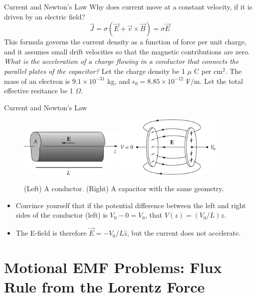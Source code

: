 \documentclass{beamer}
\begin{document}
\begin{frame}{Current and Newton's Law}
Why does current move at a constant velocity, if it is driven by an electric field?
\begin{equation}
\vec{J} = \sigma (\vec{E} + \vec{v} \times \vec{B} ) = \sigma \vec{E}
\end{equation}
This formula governs the current density as a function of force per unit charge, and it assumes small drift velocities so that the magnetic contributions are zero. \\ \vspace{0.5cm}
\textit{What is the acceleration of a charge flowing in a conductor that connects the parallel plates of the capacitor?} Let the charge density be 1 $\mu$ C per cm$^2$.  The mass of an electron is $9.1\times 10^{-31}$ kg, and $\epsilon_0 = 8.85 \times 10^{-12}$ F/m.  Let the total effective resitance be 1 $\Omega$.
\end{frame}

\begin{frame}{Current and Newton's Law}
\begin{figure}
\centering
\includegraphics[width=5cm]{figures/7_1.jpg}
\includegraphics[width=5cm]{figures/7_3.jpg}
\caption{\label{fig:cond1} (Left) A conductor. (Right) A capacitor with the same geometry.}
\end{figure}
\begin{itemize}
\item Convince yourself that if the potential difference between the left and right sides of the conductor (left) is $V_0 - 0 = V_0$, that $V(z) = (V_0/L) z$.
\item The E-field is therefore $\vec{E} = - V_0/L \hat{z}$, but the current does not accelerate.
\end{itemize}
\end{frame}

\section{Motional EMF Problems: Flux Rule from the Lorentz Force}
\end{document}
